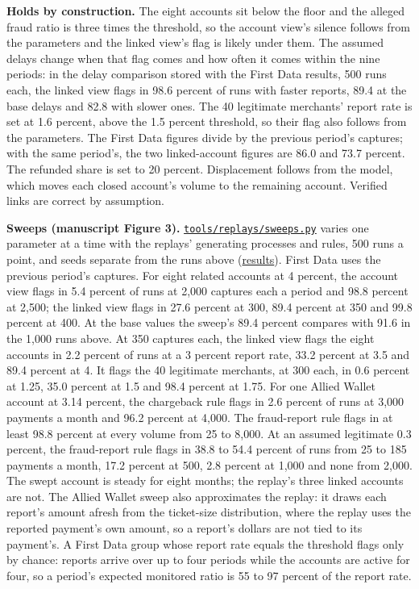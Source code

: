 \documentclass[
  11pt,
]{article}
\begin{document}
\endgroup

\textbf{Holds by construction.} The eight accounts sit below the floor
and the alleged fraud ratio is three times the threshold, so the account
view's silence follows from the parameters and the linked view's flag is
likely under them. The assumed delays change when that flag comes and
how often it comes within the nine periods: in the delay comparison
stored with the First Data results, 500 runs each, the linked view flags
in 98.6 percent of runs with faster reports, 89.4 at the base delays and
82.8 with slower ones. The 40 legitimate merchants' report rate is set
at 1.6 percent, above the 1.5 percent threshold, so their flag also
follows from the parameters. The First Data figures divide by the
previous period's captures; with the same period's, the two
linked-account figures are 86.0 and 73.7 percent. The refunded share is
set to 20 percent. Displacement follows from the model, which moves each
closed account's volume to the remaining account. Verified links are
correct by assumption.

\textbf{Sweeps (manuscript Figure 3).}
\href{tools/replays/sweeps.py}{\texttt{tools/replays/sweeps.py}} varies
one parameter at a time with the replays' generating processes and
rules, 500 runs a point, and seeds separate from the runs above
(\href{SUPPLEMENT/S10_REPLAYS/sweep_results.json}{results}). First Data
uses the previous period's captures. For eight related accounts at 4
percent, the account view flags in 5.4 percent of runs at 2,000 captures
each a period and 98.8 percent at 2,500; the linked view flags in 27.6
percent at 300, 89.4 percent at 350 and 99.8 percent at 400. At the base
values the sweep's 89.4 percent compares with 91.6 in the 1,000 runs
above. At 350 captures each, the linked view flags the eight accounts in
2.2 percent of runs at a 3 percent report rate, 33.2 percent at 3.5 and
89.4 percent at 4. It flags the 40 legitimate merchants, at 300 each, in
0.6 percent at 1.25, 35.0 percent at 1.5 and 98.4 percent at 1.75. For
one Allied Wallet account at 3.14 percent, the chargeback rule flags in
2.6 percent of runs at 3,000 payments a month and 96.2 percent at 4,000.
The fraud-report rule flags in at least 98.8 percent at every volume
from 25 to 8,000. At an assumed legitimate 0.3 percent, the fraud-report
rule flags in 38.8 to 54.4 percent of runs from 25 to 185 payments a
month, 17.2 percent at 500, 2.8 percent at 1,000 and none from 2,000.
The swept account is steady for eight months; the replay's three linked
accounts are not. The Allied Wallet sweep also approximates the replay:
it draws each report's amount afresh from the ticket-size distribution,
where the replay uses the reported payment's own amount, so a report's
dollars are not tied to its payment's. A First Data group whose report
rate equals the threshold flags only by chance: reports arrive over up
to four periods while the accounts are active for four, so a period's
expected monitored ratio is 55 to 97 percent of the report rate.
\end{document}
